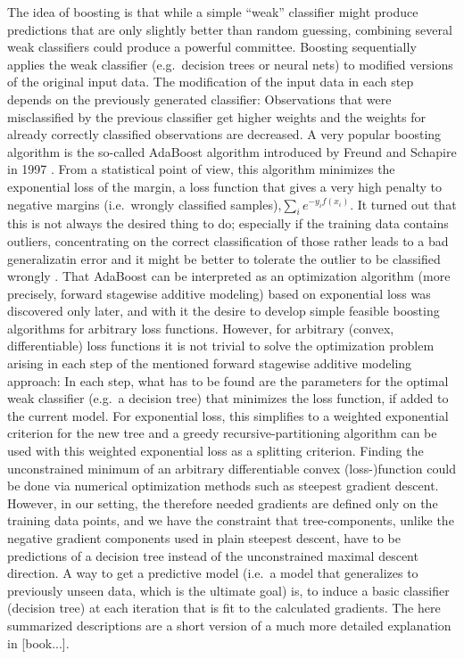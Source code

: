 The idea of boosting is that while a simple ``weak'' classifier might produce predictions that are only slightly better than random guessing, combining several weak classifiers could produce a powerful committee. 
Boosting sequentially applies the weak classifier (e.g.\ decision trees or neural nets) to modified versions of the original input data. 
The modification of the input data in each step depends on the previously generated classifier: Observations that were misclassified by the previous classifier get higher weights and the weights for already correctly classified observations are decreased. 
A very popular boosting algorithm is the so-called AdaBoost algorithm introduced by Freund and Schapire in 1997 . 
From a statistical point of view, this algorithm minimizes the exponential loss of the margin, a loss function that gives a very high penalty to negative margins (i.e.\ wrongly classified samples),$\sum_i e^{-y_i f(x_i)}$. 
It turned out that this is not always the desired thing to do; especially if the training data contains outliers, concentrating on the correct classification of those rather leads to a bad generalizatin error and it might be better to tolerate the outlier to be classified wrongly . 
That AdaBoost can be interpreted as an optimization algorithm (more precisely, forward stagewise additive modeling) based on exponential loss was discovered only later, and with it the desire to develop simple feasible boosting algorithms for arbitrary loss functions. 
However, for arbitrary (convex, differentiable) loss functions it is not trivial to solve the optimization problem arising in each step of the mentioned forward stagewise additive modeling approach: 
In each step, what has to be found are the parameters for the optimal weak classifier (e.g.\ a decision tree) that minimizes the loss function, if added to the current model. 
For exponential loss, this simplifies to a weighted exponential criterion for the new tree and a greedy recursive-partitioning algorithm can be used with this weighted exponential loss as a splitting criterion. 
Finding the unconstrained minimum of an arbitrary differentiable convex (loss-)function could be done via numerical optimization methods such as steepest gradient descent. 
However, in our setting, the therefore needed gradients are defined only on the training data points, and we have the constraint that tree-components, unlike the negative gradient components used in plain steepest descent, have to be predictions of a decision tree instead of the unconstrained maximal descent direction. 
A way to get a predictive model (i.e.\ a model that generalizes to previously unseen data, which is the ultimate goal) is, to induce a basic classifier (decision tree) at each iteration that is fit to the calculated gradients. 
The here summarized descriptions are a short version of a much more detailed explanation in [book...].